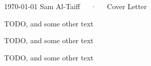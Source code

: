 \documentclass[11pt, a4paper]{awesome-cv}
\begin{document}
\makecvheader[C]

\makecvfooter
  {\today}
  {Sam Al-Taiff~~~·~~~Cover Letter}
  {\thepage}


\begin{cvletter}

TODO, and some other text

TODO, and some other text

TODO, and some other text

\end{cvletter}


\makeletterclosing
\end{document}
